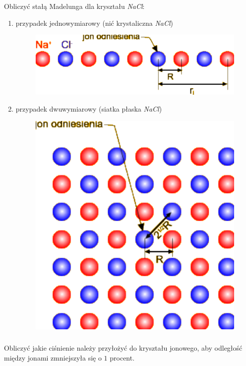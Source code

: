\subsubsection{}
Obliczyć stałą Madelunga dla kryształu \textit{NaCl}:
\begin{enumerate}
\item przypadek jednowymiarowy (nić krystaliczna \textit{NaCl})
\begin{figure}[h!]
\centering
\includegraphics[scale=0.3]{images/zes2-1}
\end{figure}
\item przypadek dwuwymiarowy (siatka płaska \textit{NaCl})
\begin{figure}[h!]
\centering
\includegraphics[scale=0.2]{images/zes2-2}
\end{figure}
\end{enumerate}
\subsubsection{}
Obliczyć jakie ciśnienie należy przyłożyć do kryształu jonowego, aby odległość między jonami zmniejszyła się o $1$ procent.